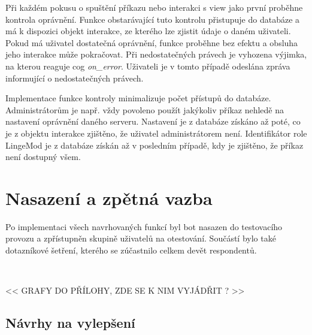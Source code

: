 \documentclass[FM]{tulthesis}
\begin{document}
	Při každém pokusu o spuštění příkazu nebo interakci s view jako první proběhne kontrola oprávnění. Funkce obstarávající tuto kontrolu přistupuje do databáze a má k dispozici objekt interakce, ze kterého lze zjistit údaje o daném uživateli. Pokud má uživatel dostatečná oprávnění, funkce proběhne bez efektu a obsluha jeho interakce může pokračovat. Při nedostatečných právech je vyhozena výjimka, na kterou reaguje cog \textit{on\_error}. Uživateli je v tomto případě odeslána zpráva informující o nedostatečných právech.
	
	Implementace funkce kontroly minimalizuje počet přístupů do databáze. Administrátorům je např. vždy povoleno použít jakýkoliv příkaz nehledě na nastavení oprávnění daného serveru. Nastavení je z databáze získáno až poté, co je z objektu interakce zjištěno, že uživatel administrátorem není. Identifikátor role LingeMod je z databáze získán až v posledním případě, kdy je zjištěno, že příkaz není dostupný všem.
	
		
	\section{Nasazení a zpětná vazba}
	
	Po implementaci všech navrhovaných funkcí byl bot nasazen do testovacího provozu a zpřístupněn skupině uživatelů na otestování. Součástí bylo také dotazníkové šetření, kterého se zúčastnilo celkem devět respondentů.
	
	$ $%
	
	<< GRAFY DO PŘÍLOHY, ZDE SE K NIM VYJÁDŘIT ? >>
	
	\subsection{Návrhy na vylepšení}
	
\end{document}
